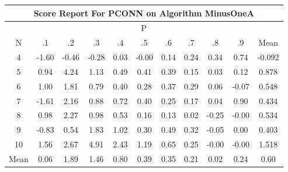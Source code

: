 \documentclass[11pt,a4paper]{report}
\begin{document}
\begin{longtable}{ | c || c | c | c | c | c | c | c | c | c || c |}
\hline
\multicolumn{11}{|c|}{ Score Report For PCONN on Algorithm MinusOneA} \\
\hline
\multicolumn{11}{|c|}{ P } \\
\hline
N & .1 & .2 & .3 & .4 & .5 & .6 & .7 & .8 & .9 & Mean\\
 \hline
 \hline
 \endhead
  4 &  \cellcolor[HTML]{FFD7D7} -1.60 &  \cellcolor[HTML]{FFF7F7} -0.46 &  \cellcolor[HTML]{FFF7F7} -0.28 &  \cellcolor[HTML]{FFFFFF} 0.03 &  \cellcolor[HTML]{FFFFFF} -0.00 &  \cellcolor[HTML]{FFFFFF} 0.14 &  \cellcolor[HTML]{F7F7FF} 0.24 &  \cellcolor[HTML]{F7F7FF} 0.34 &  \cellcolor[HTML]{EFEFFF} 0.74 & -0.092 \\
  5 &  \cellcolor[HTML]{E7E7FF} 0.94 &  \cellcolor[HTML]{9797FF} 4.24 &  \cellcolor[HTML]{DFDFFF} 1.13 &  \cellcolor[HTML]{EFEFFF} 0.49 &  \cellcolor[HTML]{F7F7FF} 0.41 &  \cellcolor[HTML]{F7F7FF} 0.39 &  \cellcolor[HTML]{FFFFFF} 0.15 &  \cellcolor[HTML]{FFFFFF} 0.03 &  \cellcolor[HTML]{FFFFFF} 0.12 & 0.878 \\
  6 &  \cellcolor[HTML]{E7E7FF} 1.00 &  \cellcolor[HTML]{CFCFFF} 1.81 &  \cellcolor[HTML]{EFEFFF} 0.79 &  \cellcolor[HTML]{F7F7FF} 0.40 &  \cellcolor[HTML]{F7F7FF} 0.28 &  \cellcolor[HTML]{F7F7FF} 0.37 &  \cellcolor[HTML]{F7F7FF} 0.29 &  \cellcolor[HTML]{FFFFFF} 0.06 &  \cellcolor[HTML]{FFFFFF} -0.07 & 0.548 \\
  7 &  \cellcolor[HTML]{FFD7D7} -1.61 &  \cellcolor[HTML]{C7C7FF} 2.16 &  \cellcolor[HTML]{E7E7FF} 0.88 &  \cellcolor[HTML]{EFEFFF} 0.72 &  \cellcolor[HTML]{F7F7FF} 0.40 &  \cellcolor[HTML]{F7F7FF} 0.25 &  \cellcolor[HTML]{F7F7FF} 0.17 &  \cellcolor[HTML]{FFFFFF} 0.04 &  \cellcolor[HTML]{E7E7FF} 0.90 & 0.434 \\
  8 &  \cellcolor[HTML]{E7E7FF} 0.98 &  \cellcolor[HTML]{C7C7FF} 2.27 &  \cellcolor[HTML]{E7E7FF} 0.98 &  \cellcolor[HTML]{EFEFFF} 0.53 &  \cellcolor[HTML]{F7F7FF} 0.16 &  \cellcolor[HTML]{FFFFFF} 0.13 &  \cellcolor[HTML]{FFFFFF} 0.02 &  \cellcolor[HTML]{FFF7F7} -0.25 &  \cellcolor[HTML]{FFFFFF} -0.00 & 0.534 \\
  9 &  \cellcolor[HTML]{FFE7E7} -0.83 &  \cellcolor[HTML]{EFEFFF} 0.54 &  \cellcolor[HTML]{CFCFFF} 1.83 &  \cellcolor[HTML]{E7E7FF} 1.02 &  \cellcolor[HTML]{F7F7FF} 0.30 &  \cellcolor[HTML]{EFEFFF} 0.49 &  \cellcolor[HTML]{F7F7FF} 0.32 &  \cellcolor[HTML]{FFFFFF} -0.05 &  \cellcolor[HTML]{FFFFFF} 0.00 & 0.403 \\
  10 &  \cellcolor[HTML]{D7D7FF} 1.56 &  \cellcolor[HTML]{BFBFFF} 2.67 &  \cellcolor[HTML]{8787FF} 4.91 &  \cellcolor[HTML]{BFBFFF} 2.43 &  \cellcolor[HTML]{DFDFFF} 1.19 &  \cellcolor[HTML]{EFEFFF} 0.65 &  \cellcolor[HTML]{F7F7FF} 0.25 &  \cellcolor[HTML]{FFFFFF} -0.00 &  \cellcolor[HTML]{FFFFFF} -0.00 & 1.518 \\
 \hline
 \hline
Mean &  \cellcolor[HTML]{FFFFFF} 0.06 &  \cellcolor[HTML]{CFCFFF} 1.89 &  \cellcolor[HTML]{D7D7FF} 1.46 &  \cellcolor[HTML]{E7E7FF} 0.80 &  \cellcolor[HTML]{F7F7FF} 0.39 &  \cellcolor[HTML]{F7F7FF} 0.35 &  \cellcolor[HTML]{F7F7FF} 0.21 &  \cellcolor[HTML]{FFFFFF} 0.02 &  \cellcolor[HTML]{F7F7FF} 0.24 &  \cellcolor[HTML]{EFEFFF} 0.60
\end{longtable}
\end{document}
